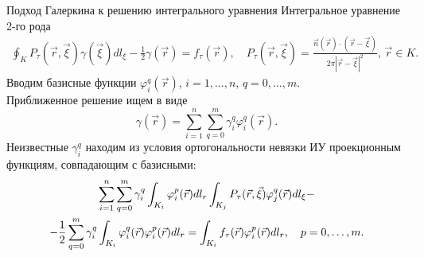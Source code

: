 \documentclass[ignoreonframetext,unicode]{beamer}
\begin{document}
\begin{frame}{Подход Галеркина к решению интегрального уравнения}
	Интегральное уравнение 2-го рода
	\begin{gather*}
		\oint_{K} P_{\tau}(\vec r, \vec{\xi})\gamma(\vec{\xi})dl_{\xi}-\frac12\gamma(\vec r)=f_{\tau}(\vec r), \quad
		P_{\tau}(\vec r, \vec{\xi})=\frac{\vec n (\vec r)\cdot(\vec r-\vec{\xi})}{2\pi|\vec r-\vec{\xi}|^2},\, \vec r\in K.
	\end{gather*}
	Вводим базисные функции $\varphi_i^q(\vec r)$, $i=1,\ldots, n$, $q=0,\ldots,m$.\\
	Приближенное решение ищем в виде\vspace*{-2.5mm}
	\[
		\gamma(\vec r)=\sum_{i=1}^{n}\sum_{q=0}^{m}\gamma_i^q\varphi_i^q(\vec r).
	\]\vspace*{-1.0mm}
	Неизвестные $\gamma_i^q$ находим из условия ортогональности невязки ИУ проекционным функциям, совпадающим с базисными:
	\begin{gather*}\vspace*{2.5mm}
		\sum_{i=1}^{n}\sum_{q=0}^{m}\gamma_i^q\int_{K_i}\varphi_i^p(\vec r)dl_r\int_{K_j} P_{\tau}(\vec r,\vec{\xi})\varphi_j^q(\vec r)dl_{\xi}{}-\\[-2.5mm]-{}\frac12\sum_{q=0}^{m}\gamma_i^q\int_{K_i}\varphi_i^q(\vec r)\varphi_i^p(\vec r)dl_r=\int_{K_i} f_{\tau}(\vec r)\varphi_i^p(\vec r)dl_r,\quad p=0,\ldots,m.
	\end{gather*}\vspace*{-2.5mm}
\end{frame}




\end{document}
